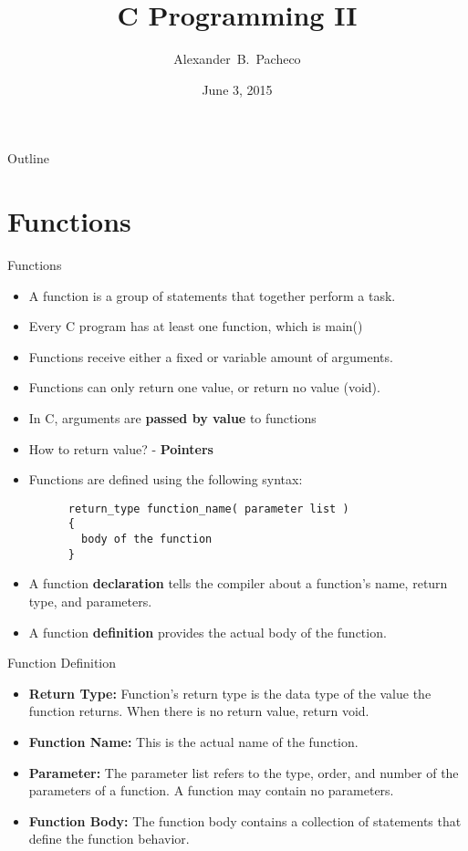 \documentclass[10pt,t]{beamer}
\title{C Programming II}
\author[Alex Pacheco]{\large{Alexander~B.~Pacheco}}
\institute{\href{http://researchcomputing.lehigh.edu}{LTS Research Computing}}
\date{June 3, 2015}
\begin{document}
\frame{\titlepage}

\begin{frame}{Outline}
  \tableofcontents
\end{frame}

\section{Functions}
\begin{frame}[fragile]{Functions}
  \begin{itemize}
  \item A function is a group of statements that together perform a task.
  \item Every C program has at least one function, which is main()
  \item Functions receive either a fixed or variable amount of arguments.
  \item Functions can only return one value, or return no value (void).
  \item In C, arguments are \textbf{passed by value} to functions
  \item How to return value? - \textbf{Pointers}
  \item Functions are defined using the following syntax:
    \begin{lstlisting}
      return_type function_name( parameter list )
      {
        body of the function
      }
    \end{lstlisting}
  \item A function \textbf{declaration} tells the compiler about a function's name, return type, and parameters.
  \item A function \textbf{definition} provides the actual body of the function.
  \end{itemize}
\end{frame}

\begin{frame}[fragile]{Function Definition}
  \begin{itemize}
  \item \textbf{Return Type:} Function's return type is the data type of the value the function returns. When there is no return value, return void.
  \item \textbf{Function Name:} This is the actual name of the function.
  \item \textbf{Parameter:} The parameter list refers to the type, order, and number of the parameters of a function. A function may contain no parameters.
  \item \textbf{Function Body:} The function body contains a collection of statements that define the function behavior.
  \end{itemize}
  
\end{frame}
\end{document}
